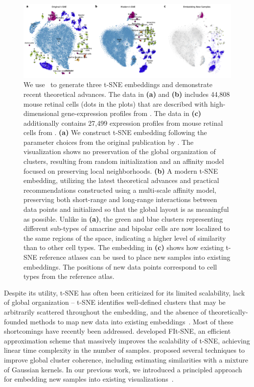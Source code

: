 \documentclass[article]{jss}
\newcommand{\opentsne}{\pkg{openTSNE}}
\begin{document}
\begin{figure}[ht]
  \includegraphics[width=\textwidth]{macosko2015}
  \caption{\label{fig:macosko}
We use \opentsne\ to generate three t-SNE embeddings and demonstrate recent theoretical advances. The data in \textbf{(a)} and \textbf{(b)} includes 44,808 mouse retinal cells (dots in the plots) that are described with high-dimensional gene-expression profiles from \citet{macosko2015highly}. The data in \textbf{(c)} additionally contains 27,499 expression profiles from mouse retinal cells from \citet{shekhar2016comprehensive}. \textbf{(a)} We construct t-SNE embedding following the parameter choices from the original publication by \citet{maaten2008visualizing}. The visualization shows no preservation of the global organization of clusters, resulting from random initialization and an affinity model focused on preserving local neighborhoods. \textbf{(b)} A modern t-SNE embedding, utilizing the latest theoretical advances and practical recommendations constructed using a multi-scale affinity model, preserving both short-range and long-range interactions between data points and initialized so that the global layout is as meaningful as possible. Unlike in \textbf{(a)}, the green and blue clusters representing different sub-types of amacrine and bipolar cells are now localized to the same regions of the space, indicating a higher level of similarity than to other cell types. The embedding in \textbf{(c)} shows how existing t-SNE reference atlases can be used to place new samples into existing embeddings. The positions of new data points correspond to cell types from the reference atlas.
}
\end{figure}

Despite its utility, t-SNE has often been criticized for its limited scalability, lack of global organization -- t-SNE identifies well-defined clusters that may be arbitrarily scattered throughout the embedding, and the absence of theoretically-founded methods to map new data into existing embeddings~\citep{ding2018interpretable,becht2019dimensionality}. Most of these shortcomings have recently been addressed. \citet{linderman2019fast} developed FIt-SNE, an efficient approximation scheme that massively improves the scalability of t-SNE, achieving linear time complexity in the number of samples. \citet{kobak2019art} proposed several techniques to improve global cluster coherence, including estimating similarities with a mixture of Gaussian kernels. In our previous work, we introduced a principled approach for embedding new samples into existing visualizations~\citep{policar2019embedding}.
\end{document}
